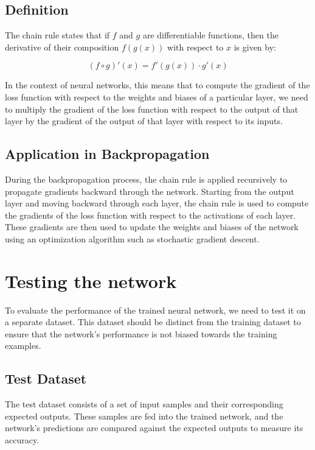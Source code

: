 \documentclass{article}
\begin{document}
\subsection{Definition}

The chain rule states that if \( f \) and \( g \) are differentiable functions, then the derivative of their composition \( f(g(x)) \) with respect to \( x \) is given by:

\[
(f \circ g)'(x) = f'(g(x)) \cdot g'(x)
\]

In the context of neural networks, this means that to compute the gradient of the loss function with respect to the weights and biases of a particular layer, we need to multiply the gradient of the loss function with respect to the output of that layer by the gradient of the output of that layer with respect to its inputs.

\subsection{Application in Backpropagation}

During the backpropagation process, the chain rule is applied recursively to propagate gradients backward through the network. Starting from the output layer and moving backward through each layer, the chain rule is used to compute the gradients of the loss function with respect to the activations of each layer. These gradients are then used to update the weights and biases of the network using an optimization algorithm such as stochastic gradient descent.

\newpage
\section{Testing the network}
To evaluate the performance of the trained neural network, we need to test it on a separate dataset. This dataset should be distinct from the training dataset to ensure that the network's performance is not biased towards the training examples.

\subsection{Test Dataset}

The test dataset consists of a set of input samples and their corresponding expected outputs.
These samples are fed into the trained network, and the network's predictions are compared against the expected outputs to measure its accuracy.
\end{document}
